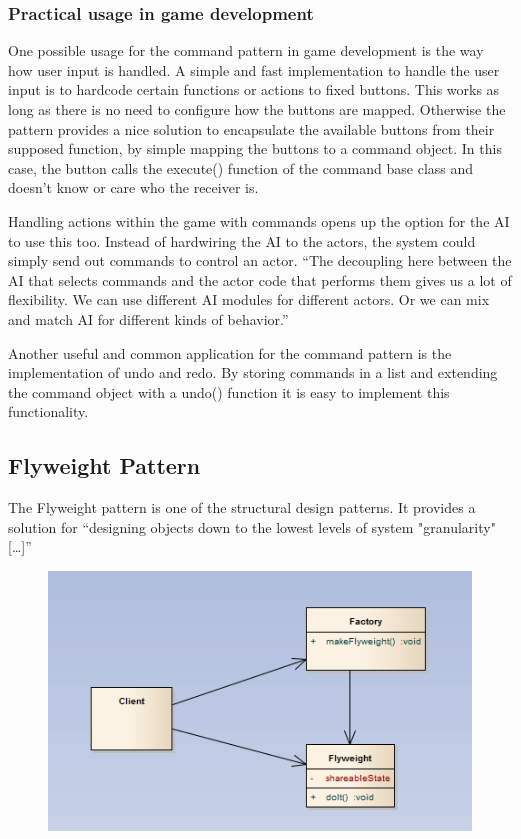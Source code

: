 \subsubsection{Practical usage in game development}
One possible usage for the command pattern in game development is the way how user input is handled. A simple and fast implementation to handle the user input is to hardcode certain functions or actions to fixed buttons. This works as long as there is no need to configure how the buttons are mapped. Otherwise the pattern provides a nice solution to encapsulate the available buttons from their supposed function, by simple mapping the buttons to a command object. In this case, the button calls the execute() function of the command base class and doesn't know or care who the receiver is.

Handling actions within the game with commands opens up the option for the AI to use this too. Instead of hardwiring the AI to the actors, the system could simply send out commands to control an actor.
“The decoupling here between the AI that selects commands and the actor code that performs them gives us a lot of flexibility. We can use different AI modules for different actors. Or we can mix and match AI for different kinds of behavior.”\citep{nystrom2014game}
 
Another useful and common application for the command pattern is the implementation of undo and redo. By storing commands in a list and extending the command object with a undo() function it is easy to implement this functionality. 

\subsection{Flyweight Pattern}
The Flyweight pattern is one of the structural design patterns. It provides a solution for “designing objects down to the lowest levels of system "granularity"[…]” \citep{Shvets}
\begin{figure}[!hbp]
\includegraphics[scale=0.70]{img/pics/flyweight.PNG}
\caption{ \protect \cite{Shvets}}
\label{fig:ref_flyweight}
\end{figure}
